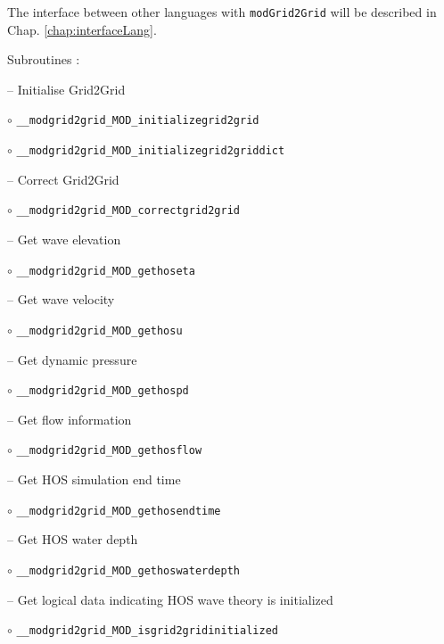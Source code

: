 The interface between other languages with \texttt{modGrid2Grid} will be described in Chap. \ref{chap:interfaceLang}. 

\vspace{0.5cm}

Subroutines : 

\vspace{0.5cm}

-- Initialise Grid2Grid

\hspace{0.5 cm} $\circ$ \texttt{\_\_modgrid2grid\_MOD\_initializegrid2grid} 

\hspace{0.5 cm} $\circ$ \texttt{\_\_modgrid2grid\_MOD\_initializegrid2griddict}
\vspace{0.2cm}

-- Correct Grid2Grid

\hspace{0.5 cm} $\circ$ \texttt{\_\_modgrid2grid\_MOD\_correctgrid2grid}
\vspace{0.2cm}

-- Get wave elevation

\hspace{0.5 cm} $\circ$ \texttt{\_\_modgrid2grid\_MOD\_gethoseta}
\vspace{0.2cm}

-- Get wave velocity

\hspace{0.5 cm} $\circ$ \texttt{\_\_modgrid2grid\_MOD\_gethosu}
\vspace{0.2cm}

-- Get dynamic pressure

\hspace{0.5 cm} $\circ$ \texttt{\_\_modgrid2grid\_MOD\_gethospd}
\vspace{0.2cm}

-- Get flow information 

\hspace{0.5 cm} $\circ$ \texttt{\_\_modgrid2grid\_MOD\_gethosflow}
\vspace{0.2cm}

-- Get HOS simulation end time

\hspace{0.5 cm} $\circ$ \texttt{\_\_modgrid2grid\_MOD\_gethosendtime}
\vspace{0.2cm}

-- Get HOS water depth

\hspace{0.5 cm} $\circ$ \texttt{\_\_modgrid2grid\_MOD\_gethoswaterdepth}
\vspace{0.2cm}

-- Get logical data indicating HOS wave theory is initialized

\hspace{0.5 cm} $\circ$ \texttt{\_\_modgrid2grid\_MOD\_isgrid2gridinitialized}

